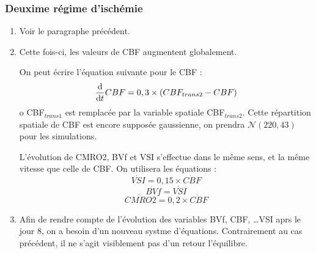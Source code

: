 \subsubsection{Deuxime r\'egime d'isch\'emie}

\begin{enumerate}[label=\textbf{(L\'esion 2 - \arabic*)}]
\item Voir le paragraphe pr\'ec\'edent.
\item Cette fois-ci, les valeurs de CBF augmentent globalement. %

On peut \'ecrire l'\'equation suivante pour le CBF :
\begin{equation}
\der{CBF}=0,3\times \left(CBF_{trans2}-CBF\right)%
\label{cbf_is2}
\end{equation}
o CBF${}_{trans1}$ est remplac\'ee par la variable spatiale CBF${}_{trans2}$. %
Cette r\'epartition spatiale de CBF est encore suppos\'ee gaussienne, on prendra $\mathcal{N}(220,43)$ pour les simulations.

\par
L'\'evolution de CMRO2, BVf et VSI s'effectue dans le m\^eme sens, et  la m\^eme vitesse que celle de CBF. On utilisera les \'equations :
\begin{equation}
\dot{VSI}=0,15\times\dot{CBF}
\label{vsi_is2_tr}
\end{equation}
\begin{equation}
\dot{BVf}=\dot{VSI}
\label{bvf_is2_tr}
\end{equation}
\begin{equation}
\dot{CMRO2}=0,2\times\dot{CBF}
\label{cmro2_is2_tr}
\end{equation}
\item %
%
Afin de rendre compte de l'\'evolution des variables BVf, CBF, \dots VSI aprs le jour 8, on a besoin d'un nouveau systme d'\'equations. %
Contrairement au cas pr\'ec\'edent, il ne s'agit visiblement pas d'un retour  l'\'equilibre.


\end{enumerate}
